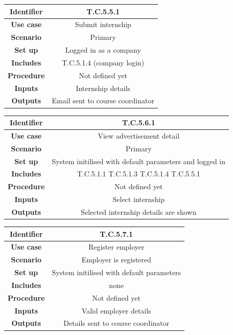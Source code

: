 \documentclass{l3deliverable}
\begin{document}
\begin{tabular}{|c|c|}
\hline \textbf{Identifier} & T.C.5.5.1\\
\hline \textbf{Use case} & Submit internship\\
\hline \textbf{Scenario} & Primary\\
\hline \textbf{Set up} & Logged in as a company\\
\hline \textbf{Includes} & T.C.5.1.4 (company login)\\
\hline \textbf{Procedure} & Not defined yet\\
\hline \textbf{Inputs} & Internship details\\
\hline \textbf{Outputs} & Email sent to course coordinator\\
\hline
\end{tabular}

\begin{tabular}{|c|c|}
\hline \textbf{Identifier} & T.C.5.6.1\\
\hline \textbf{Use case} & View advertisement detail\\
\hline \textbf{Scenario} & Primary\\
\hline \textbf{Set up} & System initilised with default parameters and logged in\\
\hline \textbf{Includes} & T.C.5.1.1 T.C.5.1.3 T.C.5.1.4 T.C.5.5.1\\
\hline \textbf{Procedure} & Not defined yet\\
\hline \textbf{Inputs} & Select internship\\
\hline \textbf{Outputs} & Selected internship details are shown\\
\hline
\end{tabular}

\begin{tabular}{|c|c|}
\hline \textbf{Identifier} & T.C.5.7.1\\
\hline \textbf{Use case} & Register employer\\
\hline \textbf{Scenario} & Employer is registered\\
\hline \textbf{Set up} & System initilised with default parameters\\
\hline \textbf{Includes} & none\\
\hline \textbf{Procedure} & Not defined yet\\
\hline \textbf{Inputs} & Valid employer details\\
\hline \textbf{Outputs} & Details sent to course coordinator\\
\hline
\end{tabular}
\end{document}
